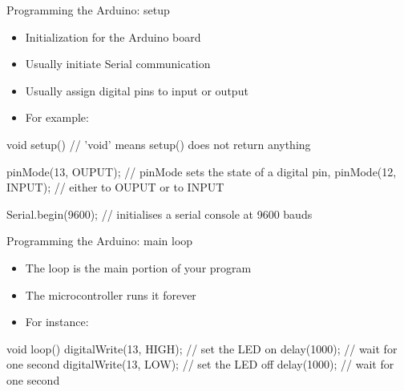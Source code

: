 \documentclass[compress]{beamer}
\begin{document}
\begin{frame}[fragile]{Programming the Arduino: setup}
    \begin{itemize}
        \item Initialization for the Arduino board
        \item Usually initiate Serial communication
        \item Usually assign digital pins to input or output
        \item For example:
    \end{itemize}

            \begin{cppcode}
void setup() // 'void' means setup() does not return anything
{
    pinMode(13, OUPUT); // pinMode sets the state of a digital pin,
    pinMode(12, INPUT); // either to OUPUT or to INPUT

    Serial.begin(9600); // initialises a serial console at 9600 bauds
}

            \end{cppcode}
\end{frame}


\begin{frame}[fragile]{Programming the Arduino: main loop}
    \begin{itemize}
        \item The loop is the main portion of your program
        \item The microcontroller runs it forever
        \item For instance:
    \end{itemize}

            \begin{cppcode}
void loop()
{
    digitalWrite(13, HIGH); // set the LED on
    delay(1000);            // wait for one second
    digitalWrite(13, LOW);  // set the LED off
    delay(1000);            // wait for one second
}

            \end{cppcode}
\end{frame}
\end{document}
